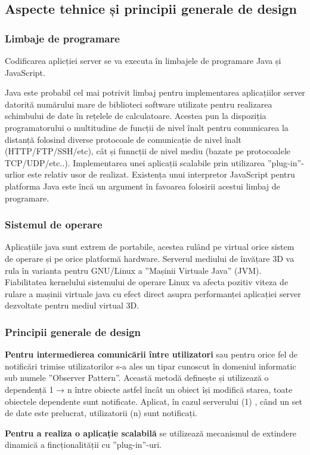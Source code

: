 \subsection{Aspecte tehnice și principii generale de design}
\subsubsection{Limbaje de programare}
\par Codificarea aplicției server se va executa în limbajele de programare Java și JavaScript.
\par Java este probabil cel mai potrivit limbaj pentru implementarea aplicațiilor server datorită numărului mare de  biblioteci software utilizate pentru realizarea schimbului de date în rețelele de calculatoare. Acestea pun la dispoziția programatorului o multitudine de funcții de nivel înalt pentru comunicarea la distanță folosind diverse protocoale de comunicație de nivel înalt (HTTP/FTP/SSH/etc), cât și funncții de nivel mediu (bazate pe protocoalele TCP/UDP/etc..). Implementarea unei aplicații scalabile prin utilizarea ”plug-in”-urlior este relativ usor de realizat. Existența unui interpretor JavaScript pentru platforma Java este încă un argument în favoarea folosirii acestui limbaj de programare.
\subsubsection {Sistemul de operare}
\par Aplicațiile java sunt extrem de portabile, acestea rulând pe virtual orice sistem de operare și pe orice platformă hardware. Serverul mediului de învățare 3D va rula în varianta pentru GNU/Linux a ”Mașinii Virtuale Java” (JVM). Fiabilitatea kernelului sistemului de operare Linux va afecta pozitiv viteza de rulare a mașinii virtuale java cu efect direct asupra performanței aplicației server dezvoltate pentru mediul virtual 3D.
\subsubsection{Principii generale de design}
\par \textbf{Pentru intermedierea comunicării între utilizatori} sau pentru orice fel de notificări trimise utilizatorilor s-a ales un tipar cunoscut în domeniul informatic sub numele ”Observer Pattern”. Această metodă definește și utilizează o dependență 1 → n între obiecte astfel încât un obiect își modifică starea, toate obiectele dependente sunt notificate. Aplicat, în cazul serverului (1) , când un set de date este prelucrat, utilizatorii (n) sunt notificați.
\par \textbf{Pentru a realiza o aplicație scalabilă} se utilizează mecanismul de extindere dinamică a fincționalității cu ”plug-in”-uri. 
